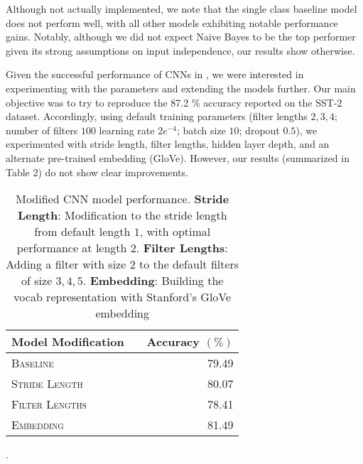 \documentclass[11pt]{article}
\begin{document}
Although not actually implemented, we note that the single class baseline model does not perform well, with all other models exhibiting notable performance gains. Notably, although we did not expect Naive Bayes to be the top performer given its strong assumptions on input independence, our results show otherwise. 

Given the successful performance of CNNs in \citet{DBLP:journals/corr/Kim14f}, we were interested in experimenting with the parameters and extending the models further. Our main objective was to try to reproduce the 87.2 \% accuracy reported on the SST-2 dataset. Accordingly, using default training parameters (filter lengths $2, 3, 4$; number of filters $100$ learning rate $2e^{-4}$; batch size $10$; dropout $0.5$), we experimented with stride length, filter lengths, hidden layer depth, and an alternate pre-trained embedding (GloVe). However, our results (summarized in Table 2) do not show clear improvements.

\begin{table}[h]
\centering
\begin{tabular}{llr}
 \toprule
Model Modification &  & Accuracy $(\%)$ \\
 \midrule
 \textsc{Baseline} & & 79.49\\
 \textsc{Stride Length} & & 80.07 \\
 \textsc{Filter Lengths} & & 78.41  \\
 \textsc{Embedding} & &81.49 \\
 \bottomrule
\end{tabular}
\caption{\label{tab:results} Modified CNN model performance. \textbf{Stride Length}: Modification to the stride length from default length $1$, with optimal performance at length $2$. \textbf{Filter Lengths}: Adding a filter with size $2$ to the default filters of size $3, 4, 5$. \textbf{Embedding}: Building the vocab representation with Stanford's GloVe embedding}.
\end{table}



\end{document}
